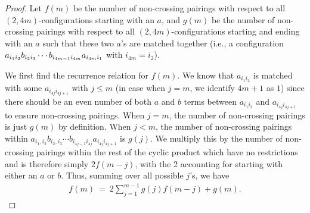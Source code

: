 \documentclass[11pt,reqno]{amsart}
\numberwithin{equation}{section}
\theoremstyle{plain}
\begin{document}
\begin{proof} Let $f(m)$ be the number of non-crossing pairings with respect to all $(2, 4m)$-configurations starting with an $a$, and $g(m)$ be the number of non-crossing pairings with respect to all $(2, 4m)$-configurations starting and ending with an $a$ such that these two $a$'s are matched together (i.e., a configuration $a_{i_1i_2}b_{i_2i_3}\cdots \\b_{i_{4m-1}i_{4m}}a_{i_{4m}i_1}$ with $i_{4m}=i_2$).

We first find the recurrence relation for $f(m)$. We know that $a_{i_1i_2}$ is matched with some $a_{i_{4j}i_{4j+1}}$ with $j\leq m$ (in case when $j=m$, we identify $4m+1$ as $1$) since there should be an even number of both $a$ and $b$ terms between $a_{i_1i_2}$ and $a_{i_{4j}i_{4j+1}}$ to ensure non-crossing pairings. When $j=m$, the number of non-crossing pairings is just $g(m)$ by definition. When $j<m$, the number of non-crossing pairings within $a_{i_1,i_2}b_{i_2,i_3}\cdots b_{i_{4j-1}i_{4j}}a_{i_{4j}i_{4j+1}}$ is $g(j)$. We multiply this by the number of non-crossing pairings within the rest of the cyclic product which have no restrictions and is therefore simply $2f(m-j)$, with the 2 accounting for starting with either an $a$ or $b$. Thus, summing over all possible $j$'s, we have
\begin{align}
f(m) \ = \ 2\sum_{j=1}^{m-1}g(j)f(m-j)+g(m).
\end{align}




\end{proof}
\end{document}
